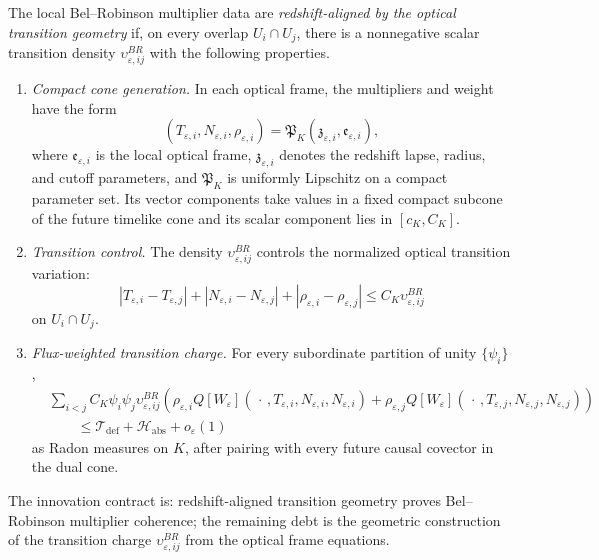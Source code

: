 \begin{definition}\label{def:RedshiftAlignedBRTransitionGeometry}
The local Bel--Robinson multiplier data are \emph{redshift-aligned by the optical transition geometry} if, on every overlap $U_i\cap U_j$, there is a nonnegative scalar transition density $\upsilon^{BR}_{\varepsilon,ij}$ with the following properties.
\begin{enumerate}
    \item \emph{Compact cone generation.} In each optical frame, the multipliers and weight have the form
    \[
        (T_{\varepsilon,i},N_{\varepsilon,i},\rho_{\varepsilon,i})
        =
        \mathfrak P_K(\mathfrak z_{\varepsilon,i},\mathfrak e_{\varepsilon,i}),
    \]
    where $\mathfrak e_{\varepsilon,i}$ is the local optical frame, $\mathfrak z_{\varepsilon,i}$ denotes the redshift lapse, radius, and cutoff parameters, and $\mathfrak P_K$ is uniformly Lipschitz on a compact parameter set. Its vector components take values in a fixed compact subcone of the future timelike cone and its scalar component lies in $[c_K,C_K]$.
    \item \emph{Transition control.} The density $\upsilon^{BR}_{\varepsilon,ij}$ controls the normalized optical transition variation:
    \[
        |T_{\varepsilon,i}-T_{\varepsilon,j}|
        +
        |N_{\varepsilon,i}-N_{\varepsilon,j}|
        +
        |\rho_{\varepsilon,i}-\rho_{\varepsilon,j}|
        \le
        C_K\upsilon^{BR}_{\varepsilon,ij}
    \]
    on $U_i\cap U_j$.
    \item \emph{Flux-weighted transition charge.} For every subordinate partition of unity $\{\psi_i\}$,
    \[
    \begin{split}
        &\sum_{i<j}
        C_K\psi_i\psi_j\upsilon^{BR}_{\varepsilon,ij}
        \left(
            \rho_{\varepsilon,i}Q[W_\varepsilon](\,\cdot\,,T_{\varepsilon,i},N_{\varepsilon,i},N_{\varepsilon,i})
            +
            \rho_{\varepsilon,j}Q[W_\varepsilon](\,\cdot\,,T_{\varepsilon,j},N_{\varepsilon,j},N_{\varepsilon,j})
        \right) \\
        &\qquad\le
        \mathcal T_{\mathrm{def}}+\mathcal H_{\mathrm{abs}}+o_\varepsilon(1)
    \end{split}
    \]
    as Radon measures on $K$, after pairing with every future causal covector in the dual cone.
\end{enumerate}
The innovation contract is: redshift-aligned transition geometry proves Bel--Robinson multiplier coherence; the remaining debt is the geometric construction of the transition charge $\upsilon^{BR}_{\varepsilon,ij}$ from the optical frame equations.
\end{definition}

